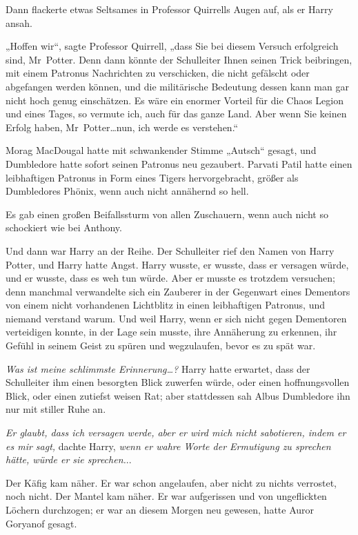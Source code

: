 {Dann flackerte etwas Seltsames in Professor Quirrells Augen auf, als er Harry ansah.

„Hoffen wir“, sagte Professor Quirrell, „dass Sie bei diesem Versuch erfolgreich sind, Mr~Potter. Denn dann könnte der Schulleiter Ihnen seinen Trick beibringen, mit einem Patronus Nachrichten zu verschicken, die nicht gefälscht oder abgefangen werden können, und die militärische Bedeutung dessen kann man gar nicht hoch genug einschätzen. Es wäre ein enormer Vorteil für die Chaos Legion und eines Tages, so vermute ich, auch für das ganze Land. Aber wenn Sie keinen Erfolg haben, Mr~Potter…nun, ich werde es verstehen.“

Morag MacDougal hatte mit schwankender Stimme „Autsch“ gesagt, und Dumbledore hatte sofort seinen Patronus neu gezaubert. Parvati Patil hatte einen leibhaftigen Patronus in Form eines Tigers hervorgebracht, größer als Dumbledores Phönix, wenn auch nicht annähernd so hell.

Es gab einen großen Beifallssturm von allen Zuschauern, wenn auch nicht so schockiert wie bei Anthony.

Und dann war Harry an der Reihe. Der Schulleiter rief den Namen von Harry Potter, und Harry hatte Angst. Harry wusste, er wusste, dass er versagen würde, und er wusste, dass es weh tun würde. Aber er musste es trotzdem versuchen; denn manchmal verwandelte sich ein Zauberer in der Gegenwart eines Dementors von einem nicht vorhandenen Lichtblitz in einen leibhaftigen Patronus, und niemand verstand warum. Und weil Harry, wenn er sich nicht gegen Dementoren verteidigen konnte, in der Lage sein musste, ihre Annäherung zu erkennen, ihr Gefühl in seinem Geist zu spüren und wegzulaufen, bevor es zu spät war.

\emph{\hfill\break Was ist meine schlimmste Erinnerung…?} Harry hatte erwartet, dass der Schulleiter ihm einen besorgten Blick zuwerfen würde, oder einen hoffnungsvollen Blick, oder einen zutiefst weisen Rat; aber stattdessen sah Albus Dumbledore ihn nur mit stiller Ruhe an.

\emph{Er glaubt, dass ich versagen werde, aber er wird mich nicht sabotieren, indem er es mir sagt,} dachte Harry, \emph{wenn er wahre Worte der Ermutigung zu sprechen hätte, würde er sie sprechen.}..

Der Käfig kam näher. Er war schon angelaufen, aber nicht zu nichts verrostet, noch nicht. Der Mantel kam näher. Er war aufgerissen und von ungeflickten Löchern durchzogen; er war an diesem Morgen neu gewesen, hatte Auror Goryanof gesagt.

}
